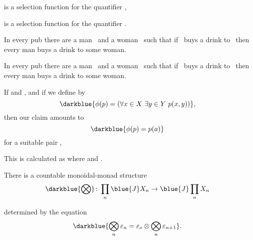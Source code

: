 \documentclass%
[%
Screen4to3,
]{foils}
\begin{document}
\qquad {} is a selection function for the
quantifier ,

\quad {}

\qquad \darkblue{$\varepsilon \otimes \delta$} is a selection function
for the quantifier \darkblue{$\phi \otimes \gamma$}.



In every pub there are a man~ and a
woman~ such that if~ buys a drink
to~ then every man buys a drink to some woman.

\vfill


In every pub there are a man~ and a
woman~ such that if~ buys a drink
to~ then every man buys a drink to some woman.

\vfill


If  and , and if we define %
\darkblue{$\phi = \forall \otimes \exists$} by
\[
\darkblue{\phi(p) = \left(\forall x \in X \,\, \exists y \in Y \,\, p(x,y)\right)},
\]
then our claim amounts to
\[
\darkblue{\phi(p) = p(a)}
\]
for a suitable pair ,

\vfill

This is calculated as  where
 and .



There is a countable monoidal-monad structure
\[
\darkblue{\bigotimes} \colon \prod_n \blue{J} X_n \to \blue{J} \prod_n X_n 
\]

 determined by the equation
\[
\darkblue{\bigotimes_n \varepsilon_n = \varepsilon_o \otimes \bigotimes_n \varepsilon_{n+1}}.
\]



\end{document}
